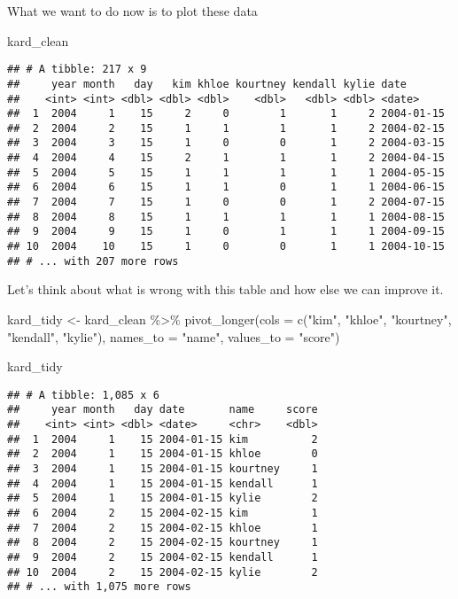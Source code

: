 \documentclass[
]{article}
\newenvironment{Shaded}{\begin{snugshade}}{\end{snugshade}}
\newcommand{\AttributeTok}[1]{\textcolor[rgb]{0.77,0.63,0.00}{#1}}
\newcommand{\FunctionTok}[1]{\textcolor[rgb]{0.00,0.00,0.00}{#1}}
\newcommand{\NormalTok}[1]{#1}
\newcommand{\OtherTok}[1]{\textcolor[rgb]{0.56,0.35,0.01}{#1}}
\newcommand{\SpecialCharTok}[1]{\textcolor[rgb]{0.00,0.00,0.00}{#1}}
\newcommand{\StringTok}[1]{\textcolor[rgb]{0.31,0.60,0.02}{#1}}
\begin{document}
What we want to do now is to plot these data

\begin{Shaded}
\begin{Highlighting}[]
\NormalTok{kard\_clean}
\end{Highlighting}
\end{Shaded}

\begin{verbatim}
## # A tibble: 217 x 9
##     year month   day   kim khloe kourtney kendall kylie date      
##    <int> <int> <dbl> <dbl> <dbl>    <dbl>   <dbl> <dbl> <date>    
##  1  2004     1    15     2     0        1       1     2 2004-01-15
##  2  2004     2    15     1     1        1       1     2 2004-02-15
##  3  2004     3    15     1     0        0       1     2 2004-03-15
##  4  2004     4    15     2     1        1       1     2 2004-04-15
##  5  2004     5    15     1     1        1       1     1 2004-05-15
##  6  2004     6    15     1     1        0       1     1 2004-06-15
##  7  2004     7    15     1     0        0       1     2 2004-07-15
##  8  2004     8    15     1     1        1       1     1 2004-08-15
##  9  2004     9    15     1     0        1       1     1 2004-09-15
## 10  2004    10    15     1     0        0       1     1 2004-10-15
## # ... with 207 more rows
\end{verbatim}

Let's think about what is wrong with this table and how else we can
improve it.

\begin{Shaded}
\begin{Highlighting}[]
\NormalTok{kard\_tidy }\OtherTok{\textless{}{-}}\NormalTok{ kard\_clean }\SpecialCharTok{\%\textgreater{}\%}
  \FunctionTok{pivot\_longer}\NormalTok{(}\AttributeTok{cols =} \FunctionTok{c}\NormalTok{(}\StringTok{"kim"}\NormalTok{, }\StringTok{"khloe"}\NormalTok{, }\StringTok{"kourtney"}\NormalTok{, }\StringTok{"kendall"}\NormalTok{, }\StringTok{"kylie"}\NormalTok{),}
               \AttributeTok{names\_to =} \StringTok{"name"}\NormalTok{,}
               \AttributeTok{values\_to =} \StringTok{"score"}\NormalTok{)}

\NormalTok{kard\_tidy}
\end{Highlighting}
\end{Shaded}

\begin{verbatim}
## # A tibble: 1,085 x 6
##     year month   day date       name     score
##    <int> <int> <dbl> <date>     <chr>    <dbl>
##  1  2004     1    15 2004-01-15 kim          2
##  2  2004     1    15 2004-01-15 khloe        0
##  3  2004     1    15 2004-01-15 kourtney     1
##  4  2004     1    15 2004-01-15 kendall      1
##  5  2004     1    15 2004-01-15 kylie        2
##  6  2004     2    15 2004-02-15 kim          1
##  7  2004     2    15 2004-02-15 khloe        1
##  8  2004     2    15 2004-02-15 kourtney     1
##  9  2004     2    15 2004-02-15 kendall      1
## 10  2004     2    15 2004-02-15 kylie        2
## # ... with 1,075 more rows
\end{verbatim}
\end{document}
